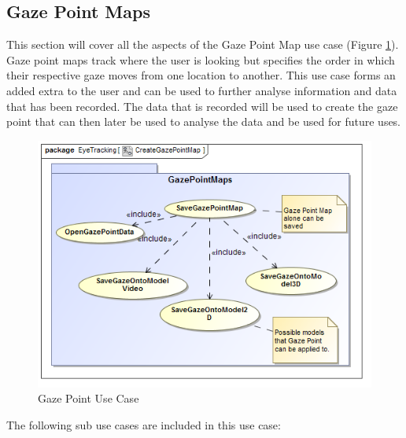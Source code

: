\subsection{Gaze Point Maps}
	This section will cover all the aspects of the Gaze Point Map use case (Figure \ref{GazePointUseCase}). Gaze point maps track where the user is looking but specifies the order in which their respective gaze moves from one location to another. This use case forms an added extra to the user and can be used to further analyse information and data that has been recorded. The data that is recorded will be used to create the gaze point that can then later be used to analyse the data and be used for future uses.
	\newline
	\begin{figure}[!ht]
		\centering
		\includegraphics[scale=0.5,width=15cm,keepaspectratio]{Diagrams/Use_Case_Diagram__CreateGazePointMap.png}
		\caption{Gaze Point Use Case}
		\label{GazePointUseCase}
	\end{figure}
	

	The following sub use cases are included in this use case:
